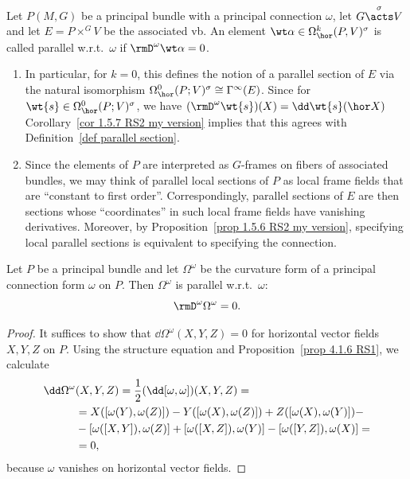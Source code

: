 \begin{defn}\label{def parallel horizontal form}
    Let $P(M,G)$ be a principal bundle with a principal connection $\omega$, let $G\overset{\sigma}{\acts}V$ and let $E=P\times^G V$ be the associated \gls{vb}. An element $\wt\alpha\in\Omega^k_{\hor}(P,V)^\sigma$ is called parallel w.r.t.\ $\omega$ if $\rmD^\omega\wt\alpha=0$.
\end{defn}

\begin{rem}
    \begin{enumerate}
        \item In particular, for $k=0$, this defines the notion of a parallel section of $E$ via the natural isomorphism $\Omega^0_{\hor}(P;V)^\sigma\cong \Gamma^\infty(E)$. Since for $\wt{s}\in \Omega^0_{\hor}(P;V)^\sigma$, we have $(\rmD^\omega \wt{s})(X)=\dd \wt{s}(\hor X)$ Corollary~\ref{cor 1.5.7 RS2 my version} implies that this agrees with Definition~\ref{def parallel section}.
        \item Since the elements of $P$ are interpreted as $G$-frames on fibers of associated bundles, we may think of parallel local sections of $P$ as local frame fields that are ``constant to first order''. Correspondingly, parallel sections of $E$ are then sections whose ``coordinates'' in such local frame fields have vanishing derivatives. Moreover, by Proposition~\ref{prop 1.5.6 RS2 my version}, specifying local parallel sections is equivalent to specifying the connection.
    \end{enumerate}
\end{rem}


\begin{prop} \label{prop 1.4.11 RS2}
    Let $P$ be a principal bundle and let $\Omega^\omega$ be the curvature form of a principal connection form $\omega$ on $P$. Then $\Omega^\omega$ is parallel w.r.t.\ $\omega$:
    \[\rmD^\omega\Omega^\omega=0.\label{eq 1.4.10 RS2 Bianchi}\]
\end{prop}
\begin{proof}
    It suffices to show that $\dd\Omega^\omega(X,Y,Z)=0$ for horizontal vector fields $X,Y,Z$ on $P$. Using the structure equation and Proposition~\ref{prop 4.1.6 RS1}, we calculate 
    \begin{align}
        \dd\Omega^\omega&(X,Y,Z)=\frac12(\dd[\omega,\omega])(X,Y,Z)=\notag\\
        &=X([\omega(Y),\omega(Z)])-Y([\omega(X),\omega(Z)])+Z([\omega(X),\omega(Y)])-\notag\\
        &-[\omega([X,Y]),\omega(Z)]+[\omega([X,Z]),\omega(Y)]-[\omega([Y,Z]),\omega(X)]=\notag\\
        &=0,
    \end{align}
    because $\omega$ vanishes on horizontal vector fields.
\end{proof}

